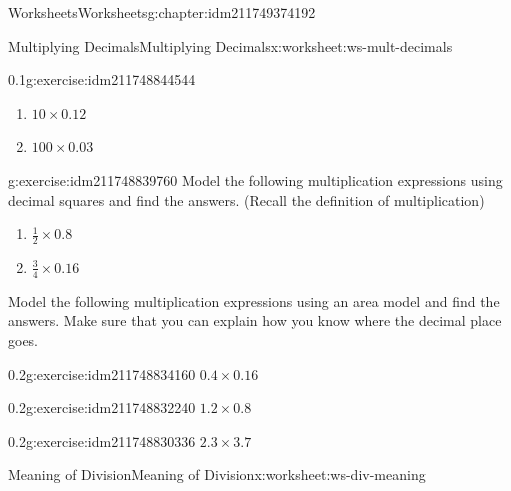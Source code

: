 \documentclass[twoside,11pt,]{book}
\begin{document}
\begin{chapterptx}{Worksheets}{}{Worksheets}{}{}{g:chapter:idm211749374192}
\begin{worksheet-section-numberless}{Multiplying Decimals}{}{Multiplying Decimals}{}{}{x:worksheet:ws-mult-decimals}
\begin{divisionexercise}{3}{}{0.1}{g:exercise:idm211748844544}
\begin{enumerate}[label=(\alph*)]
\item{}\(10 \times 0.12 \)%
\item{}\(100 \times 0.03 \)%
\end{enumerate}
\end{divisionexercise}%
\begin{divisionexercise}{4}{}{}{g:exercise:idm211748839760}%
Model the following multiplication expressions using decimal squares and find the answers. (Recall the definition of multiplication)%
%
\begin{enumerate}[label=(\alph*)]
\item{}\(\frac{1}{2} \times 0.8 \)%
\item{}\(\frac{3}{4} \times 0.16 \)%
\end{enumerate}
\end{divisionexercise}%
\clearpage
\begin{introduction}{}%
Model the following multiplication expressions using an area model and find the answers.  Make sure that you can explain how you know where the decimal place goes.%
\end{introduction}%
\begin{divisionexercise}{5}{}{0.2}{g:exercise:idm211748834160}%
\(0.4 \times 0.16\)%
\end{divisionexercise}%
\begin{divisionexercise}{6}{}{0.2}{g:exercise:idm211748832240}%
\(1.2 \times 0.8\)%
\end{divisionexercise}%
\begin{divisionexercise}{7}{}{0.2}{g:exercise:idm211748830336}%
\(2.3 \times 3.7 \)%
\end{divisionexercise}%
\end{worksheet-section-numberless}
\restoregeometry
%
%
\typeout{************************************************}
\typeout{************************************************}
%
\begin{worksheet-section-numberless}{Meaning of Division}{}{Meaning of Division}{}{}{x:worksheet:ws-div-meaning}
\begin{introduction}{}%
\begin{sidebyside}{1}{0}{0}{0}%
\begin{sbspanel}{1}%

\end{sbspanel}
\end{sidebyside}
\end{introduction}
\end{worksheet-section-numberless}
\end{chapterptx}
\end{document}
